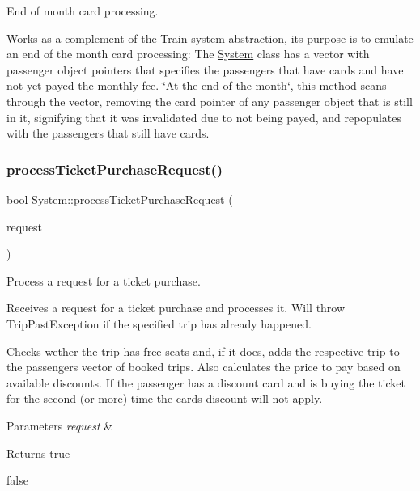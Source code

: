 End of month card processing. 

Works as a complement of the \mbox{\hyperlink{classTrain}{Train}} system abstraction, it\textquotesingle{}s purpose is to emulate an end of the month card processing\+: The \mbox{\hyperlink{classSystem}{System}} class has a vector with passenger object pointers that specifies the passengers that have cards and have not yet payed the monthly fee. \char`\"{}\+At the end of the month\char`\"{}, this method scans through the vector, removing the card pointer of any passenger object that is still in it, signifying that it was invalidated due to not being payed, and repopulates with the passengers that still have cards. \mbox{\label{classSystem_ac2b6f3d934b64f4fa56ffb1db1d261df}} 
\subsubsection{\texorpdfstring{process\+Ticket\+Purchase\+Request()}{processTicketPurchaseRequest()}}
{\footnotesize\ttfamily bool System\+::process\+Ticket\+Purchase\+Request (\begin{DoxyParamCaption}\item[{\mbox{\hyperlink{classTicketPurchaseRequest}{Ticket\+Purchase\+Request}} \&}]{request }\end{DoxyParamCaption})}



Process a request for a ticket purchase. 

Receives a request for a ticket purchase and processes it. Will throw Trip\+Past\+Exception if the specified trip has already happened.

Checks wether the trip has free seats and, if it does, adds the respective trip to the passenger\textquotesingle{}s vector of booked trips. Also calculates the price to pay based on available discounts. If the passenger has a discount card and is buying the ticket for the second (or more) time the card\textquotesingle{}s discount will not apply.


\begin{DoxyParams}{Parameters}
{\em request} & \\
\hline
\end{DoxyParams}
\begin{DoxyReturn}{Returns}
true 

false 
\end{DoxyReturn}
\mbox{\label{classSystem_af31acdda711986978533367ce3a64276}} 

